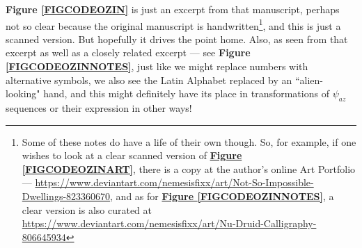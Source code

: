 \documentclass[a4paper, 18pt]{book} %
\begin{document}
\begin{appendices}
\textbf{Figure \ref{FIGCODEOZIN}} is just an excerpt from that manuscript, perhaps not so clear because the original manuscript is handwritten\footnote{Some of these notes do have a life of their own though. So, for example, if one wishes to look at a clear scanned version of \textbf{\hyperref[FIGCODEOZINART]{Figure \ref{FIGCODEOZINART}}}, there is a copy at the author's online Art Portfolio --- \url{https://www.deviantart.com/nemesisfixx/art/Not-So-Impossible-Dwellings-823360670}, and as for \textbf{\hyperref[FIGCODEOZINNOTES]{Figure \ref{FIGCODEOZINNOTES}}}, a clear version is also curated at \url{https://www.deviantart.com/nemesisfixx/art/Nu-Druid-Calligraphy-806645934}}, and this is just a scanned version. But hopefully it drives the point home. Also, as seen from that excerpt as well as a closely related excerpt --- see \textbf{Figure \ref{FIGCODEOZINNOTES}}, just like we might replace numbers with alternative symbols, we also see the Latin Alphabet replaced by an ``alien-looking" hand, and this might definitely have its place in transformations of $\psi_{az}$ sequences or their expression in other ways! 



\end{appendices}
\end{document}
